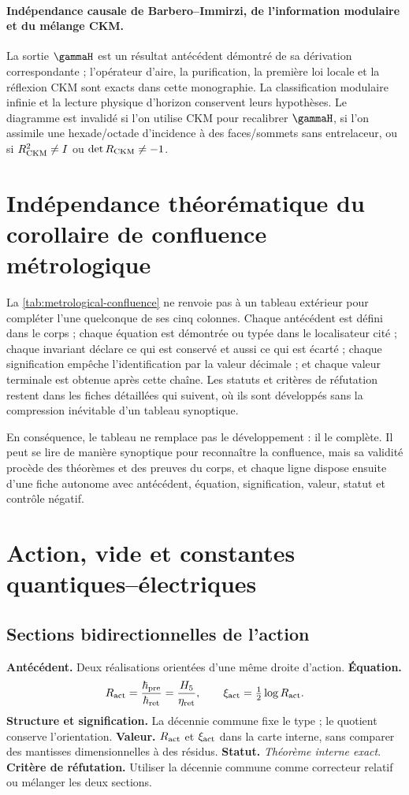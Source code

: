 \paragraph{Indépendance causale de Barbero--Immirzi, de l'information modulaire et du mélange CKM.}
La sortie \(\gammaH\) est un résultat antécédent démontré de sa dérivation correspondante ;
l'opérateur d'aire, la purification, la première loi locale et la réflexion CKM
sont exacts dans cette monographie. La classification modulaire infinie et la lecture
physique d'horizon conservent leurs hypothèses. Le diagramme est invalidé si
l'on utilise CKM pour recalibrer \(\gammaH\), si l'on assimile une hexade/octade
d'incidence à des faces/sommets sans entrelaceur, ou si
\(R_{\rm CKM}^2\ne I\) ou \(\det R_{\rm CKM}\ne-1\).

\section{Indépendance théorématique du corollaire de confluence métrologique}

La \cref{tab:metrological-confluence} ne renvoie pas à un tableau extérieur pour
compléter l'une quelconque de ses cinq colonnes. Chaque antécédent est défini dans le
corps ; chaque équation est démontrée ou typée dans le localisateur cité ;
chaque invariant déclare ce qui est conservé et aussi ce qui est écarté ; chaque
signification empêche l'identification par la valeur décimale ; et chaque valeur terminale
est obtenue après cette chaîne. Les statuts et critères de réfutation restent dans les
fiches détaillées qui suivent, où ils sont développés sans la compression inévitable
d'un tableau synoptique.

En conséquence, le tableau ne remplace pas le développement : il le complète. Il peut se lire
de manière synoptique pour reconnaître la confluence, mais sa validité procède des
théorèmes et des preuves du corps, et chaque ligne dispose ensuite d'une
fiche autonome avec antécédent, équation, signification, valeur, statut et
contrôle négatif.

\section{Action, vide et constantes quantiques--électriques}

\subsection*{Sections bidirectionnelles de l'action }
\textbf{Antécédent.} Deux réalisations orientées d'une même droite
d'action. \textbf{Équation.}
\[
R_{\rm act}=\frac{\hbar_{\rm pre}}{\hbar_{\rm ret}}
=\frac{H_5}{\eta_{\rm ret}},
\qquad \xi_{\rm act}=\tfrac12\log R_{\rm act}.
\]
\textbf{Structure et signification.} La décennie commune fixe le type ; le quotient
conserve l'orientation. \textbf{Valeur.} \(R_{\rm act}\) et
\(\xi_{\rm act}\) dans la carte interne, sans comparer des mantisses dimensionnelles à des
résidus. \textbf{Statut.} \emph{Théorème interne exact}.
\textbf{Critère de réfutation.} Utiliser la décennie commune comme correcteur relatif ou mélanger
les deux sections.

